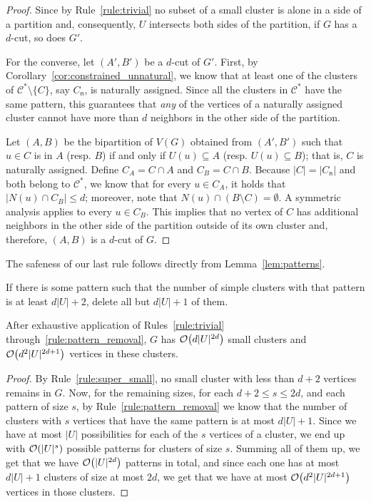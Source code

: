 \begin{proof}
    Since by Rule~\ref{rule:trivial} no subset of a small cluster is alone in a side of a partition and, consequently, $U$ intersects both sides of the partition, if $G$ has a $d$-cut, so does $G'$.

    For the converse, let $(A', B')$ be a $d$-cut of $G'$.
    First, by Corollary~\ref{cor:constrained_unnatural}, we know that at least one of the clusters of $\mathcal{C}^* \setminus \{C\}$, say $C_{\mathsf{n}}$, is naturally assigned.
    Since all the clusters in $\mathcal{C^*}$ have the same pattern, this guarantees that \textit{any} of the vertices of a naturally assigned cluster cannot have more than $d$ neighbors in the other side of the partition.

    Let $(A,B)$ be the bipartition of $V(G)$ obtained from $(A',B')$ such that $u \in C$ is in $A$ (resp. $B$) if and only if $U(u) \subseteq A$ (resp. $U(u) \subseteq B$); that is, $C$ is naturally assigned.
    Define $C_A = C \cap A$ and $C_B = C \cap B$.
    Because $|C| = |C_{\mathsf{n}}|$ and both belong to $\mathcal{C}^*$, we know that for every $u \in C_A$, it holds that $|N(u) \cap C_B| \leq d$; moreover, note that $N(u) \cap (B \setminus C) = \emptyset$. A symmetric analysis applies to every $u \in C_B$.
    This implies that no vertex of $C$ has additional neighbors in the other side of the partition outside of its own cluster and, therefore, $(A, B)$ is a $d$-cut of $G$.
\end{proof}

The safeness of our last rule follows directly from Lemma~\ref{lem:patterns}.

\begin{rrule}
    \label{rule:pattern_removal}
    If there is some pattern such that the number of simple clusters with that pattern is at least $d|U|+2$, delete all but $d|U|+1$ of them.
\end{rrule}

\begin{lemma}
    \label{lem:bound2}
    After exhaustive application of Rules~\ref{rule:trivial} through~\ref{rule:pattern_removal}, $G$ has $\mathcal{O}\!\left(d|U|^{2d}\right)$ small clusters and $\mathcal{O}\!\left(d^2|U|^{2d+1}\right)$ vertices in these clusters.
\end{lemma}

\begin{proof}
    By Rule~\ref{rule:super_small}, no small cluster with less than $d+2$ vertices remains in $G$.
    Now, for the remaining sizes, for each $d+2 \leq s \leq 2d$, and each pattern of size $s$, by Rule~\ref{rule:pattern_removal} we know that the number of clusters with $s$ vertices that have the same pattern is at most $d|U| + 1$.
    Since we have at most $|U|$ possibilities for each of the $s$ vertices of a cluster, we end up with $\mathcal{O}\!\left(|U|^{s}\right)$ possible patterns for clusters of size $s$.
    Summing all of them up, we get that we have $\mathcal{O}\!\left(|U|^{2d}\right)$ patterns in total, and since each one has at most $d|U| + 1$ clusters of size at most $2d$, we get that we have at most $\mathcal{O}\!\left(d^2|U|^{2d+1}\right)$ vertices in those clusters.
\end{proof}

